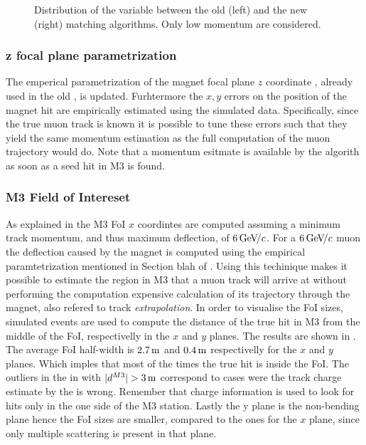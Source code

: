 \begin{figure}[t]
  \centering
  \begin{subfigure}{0.5\textwidth}
    \scalebox{.6}{}
    \caption{}
    \label{mvTTm_chi2}
  \end{subfigure}%
  \hfill%
  \begin{subfigure}{0.5\textwidth}
    \scalebox{.6}{}
    \caption{}
    \label{mvm_chi2}
  \end{subfigure}
  \caption{Distribution of the \chisq variable between the old (left) and the new (right) matching algorithms.
           Only low momentum \veloTracks are considered.}
 \label{mvm_chi2_comp}
\end{figure}

\subsubsection{z focal plane parametrization}
The emperical parametrization of the magnet focal plane $z$ coordinate \cite{blah}, already used in the old \mvm,
is updated. Furhtermore the $x,y$ errors on the position of the magnet hit are empirically estimated using the simulated data.
Specifically, since the true muon track is known it is possible to tune these errors such that they yield the same momentum
estimation as the full computation of the muon trajectory would do. Note that a momentum esitmate is available by the
\mvTTm algorith as soon as a seed hit in M3 is found.


\subsubsection{M3 Field of Intereset}
As explained in  the M3 FoI $x$ coordintes are computed assuming a minimum track momentum, and thus maximum deflection,
of $6{\mathrm{\,Ge\kern -0.1em V\!/}c}$. For a $6{\mathrm{\,Ge\kern -0.1em V\!/}c}$ muon the deflection caused by the \lhcb magnet is computed using the empirical paramtetrization mentioned in Section blah of \cite{roelThesis}.
Using this techinique makes it possible to estimate the region in M3 that a muon track will arrive at without performing the computation
expensive calculation of its trajectory through the \lhcb magnet, also refered to track {\it extrapolation}. In order to visualise the FoI sizes,
simulated events are used to compute the distance of the true hit in M3 from the middle of the FoI, respectivelly in the $x$ and $y$ planes.
The results are shown in . The average FoI half-width is $2.7\rm \,m$ and $0.4\rm \,m$ respectivelly for the $x$ and $y$ planes.
Which imples that most of the times the true hit is inside the FoI. The outliers in the  in with $|d^{M3}|>3\m$
correspond to cases were the track charge estimate by the \ttracker is wrong. Remember that charge information is used to
look for hits only in the one side of the M3 station. Lastly the y plane is the non-bending plane hence the FoI sizes
are smaller, compared to the ones for the $x$ plane, since only multiple scattering is present in that plane.

